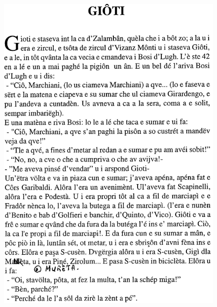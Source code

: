  \begin{figure}[htb]
    \centering
    \vspace{-0.3cm}
    \includegraphics[width=\textwidth]{Gioti2}
    \vspace{-0.3cm}
\end{figure}

